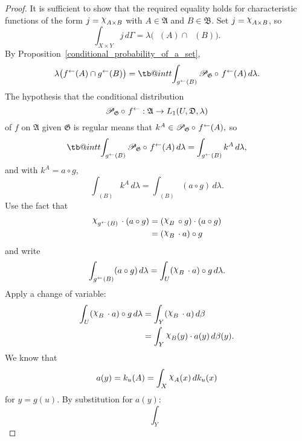 \documentclass[
twoside=true,
paper=letter,
fontsize=9pt,
pagesize=auto,
leqno,
openany,
headsepline,
overfullrule,
]{scrbook}
\makeatletter
\theoremstyle{plain}
\theoremstyle{plain}
\theoremstyle{definition}
\theoremstyle{bfnoteitalic}
\theoremstyle{bfnoteroman}
\newcommand{\sigalg}[1]{\mathfrak{#1}}
\newcommand{\cali}[1]{\mathscr{#1}}
\newcommand{\condprobop}[1]{\mathop{\cali{P}\hspace{-1pt}}\nolimits_{#1}}
\newcommand{\charfunction}[1]{\mathop{{\raisebox{2pt}{$\chi$}}_{#1}}}
\newcommand{\preimage}[1]{\mathop{#1^{\leftarrow}}}
\newcommand{\meets}{\cap}
\newcommand{\sigmaalgebra}{\sigalg{A}}
\newcommand{\sigmaalgebraii}{\sigalg{B}}
\newcommand{\funcf}{f}
\newcommand{\funcg}{g}
\newcommand{\funcj}{j}
\newcommand{\funck}{k}
\newcommand{\function}{f}
\newcommand{\measurespace}{X}
\newcommand{\measurespaceii}{Y}
\newcommand{\mspaceelt}{x}
\newcommand{\mspaceeltii}{y}
\newcommand{\measureiii}{\lambda}
\newcommand{\measlambda}{\lambda}
\newcommand{\seti}{A}
\newcommand{\setii}{B}
\newcommand{\uspace}{U}%
\newcommand{\uspaceelt}{u}
\newcommand{\uspacesig}{\sigalg{D}}
\newcommand{\measonprod}{\Gamma}%
\newcommand{\marginaltwo}{\beta}%
\newcommand\tint{\mathop{\mathpalette\tb@int{t}}\!\int}
\newcommand\tb@int[2]{%
  \sbox\z@{$\m@th#1\int$}%
  \if#2t%
    \rlap{\hbox to\wd\z@{%
      \hfil
      \vrule width .35em height \dimexpr\ht\z@+1.4pt\relax depth -\dimexpr\ht\z@+1pt\relax
      \kern.05em %
    }}
  \else
    \rlap{\hbox to\wd\z@{%
      \vrule width .35em height -\dimexpr\dp\z@+1pt\relax depth \dimexpr\dp\z@+1.4pt\relax
      \hfil
    }}
  \fi
}
\newcommand{\inducedint}{\tint}
\makeatother
\begin{document}
\begin{proof}
It is sufficient to show that the required equality holds for characteristic functions of the form
$\funcj
=
\charfunction{\seti\times\setii}$
with
$\seti\in\sigmaalgebra$
and
$\setii\in\sigmaalgebraii$.
Set
$\funcj
=
\charfunction{\seti\times\setii}$,
so
\[
\int_{\measurespace\times\measurespaceii}
\funcj
\, d\measonprod
=
\measlambda\bigl(\preimage{\funcf}(\seti)\meets \preimage{\funcg}(\setii)\bigr).
\]
By Proposition~\ref{conditional_probability_of_a_set},
\[
\measlambda\bigl(\preimage{\funcf}(\seti)\meets \preimage{\funcg}(\setii)\bigr)
=
\inducedint_{\preimage{\funcg}(\setii)}
\condprobop{\sigalg{G}}\circ\, \preimage{\function}(\seti)
\, d\measlambda.
\]
The hypothesis that the conditional distribution
\[
\condprobop{\sigalg{G}}\circ\, \preimage{\function}:
\sigmaalgebra \to L_1(\uspace,\uspacesig,\measureiii)
\]
of $\function$ on $\sigmaalgebra$ given $\sigalg{G}$
is regular means that
$\funck^\seti
\in
\condprobop{\sigalg{G}}\circ\, \preimage{\function}(\seti),$
so
\[
\inducedint_{\preimage{\funcg}(\setii)}
\condprobop{\sigalg{G}}\circ\, \preimage{\function}(\seti)
\, d\measlambda
=
\int_{\preimage{\funcg}(\setii)}
\funck^\seti \, d\measlambda,
\]
and with $\funck^\seti = a\circ \funcg$,
\[
\int_{\preimage{\funcg}(\setii)}
\funck^\seti \, d\measlambda
=
\int_{\preimage{\funcg}(\setii)}
( a\circ\funcg ) \, d\measlambda.
\]
Use the fact that
\begin{align*}
\charfunction{\preimage{\funcg}(\setii)}{}\cdot{}(a\circ\funcg)
& =
(\charfunction{\setii}{}\circ{} \funcg)\cdot(a\circ\funcg) \\
& =
(\charfunction{\setii}{}\cdot{} a)\circ \funcg \\
\end{align*}
and write
\[
\int_{\preimage{\funcg}(\setii)}
( a\circ\funcg ) \, d\measlambda
=
\int_\uspace
(\charfunction{\setii}{}\cdot{} a)\circ \funcg
\, d\measlambda.
\]
Apply a change of variable:
\begin{align*}
\int_\uspace
(\charfunction{\setii}{}\cdot{} a)\circ \funcg
\, d\measlambda
& =
\int_\measurespaceii
(\charfunction{\setii}{}\cdot{} a)\, d\marginaltwo \\
& =
\int_\measurespaceii
\charfunction{\setii}(\mspaceeltii)
\cdot
a(\mspaceeltii)\, d\marginaltwo(\mspaceeltii).
\end{align*}
We know that
\[
a(\mspaceeltii)
=
\funck_\uspaceelt(\seti)
=
\int_\measurespace
\charfunction{\seti} (\mspaceelt)
\, d\funck_\uspaceelt (\mspaceelt)
\]
for $\mspaceeltii = \funcg(\uspaceelt)$.
By substitution for $a(\mspaceeltii)$:
\[
\int_\measurespaceii
\]
\end{proof}
\end{document}

